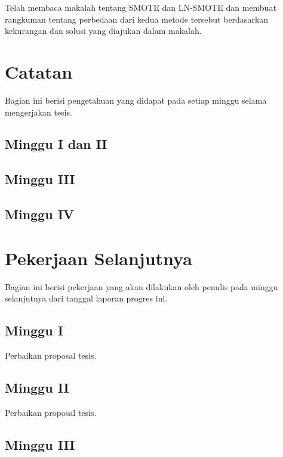Telah membaca makalah tentang SMOTE \cite{chawla2002smote} dan LN-SMOTE \cite{maciejewski2011local} dan membuat rangkuman tentang perbedaan dari kedua metode tersebut berdasarkan kekurangan dan solusi yang diajukan dalam makalah.


\newpage
\section{Catatan} \label{sec:catatan}

Bagian ini berisi pengetahuan yang didapat pada setiap minggu selama mengerjakan tesis.

\subsection{Minggu I dan II}


\subsection{Minggu III}


\subsection{Minggu IV}



\newpage
\section{Pekerjaan Selanjutnya}

Bagian ini berisi pekerjaan yang akan dilakukan oleh penulis pada minggu selanjutnya dari tanggal laporan progres ini.

\subsection{Minggu I}

Perbaikan proposal tesis.

\subsection{Minggu II}

Perbaikan proposal tesis.

\subsection{Minggu III}

